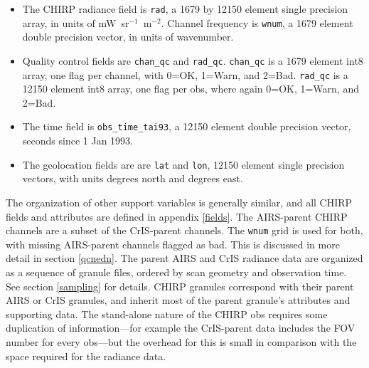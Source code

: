 \documentclass[11pt]{article}
\newcommand {\radunits} {\hbox{mW sr$^{-1}$ m$^{-2}$}}
\begin{document}
\begin{itemize}

\item
The CHIRP radiance field is \texttt{rad}, a 1679 by 12150 element
single precision array, in units of \radunits.  Channel frequency is
\texttt{wnum}, a 1679 element double precision vector, in units of
wavenumber.

\item
Quality control fields are \texttt{chan\_qc} and \texttt{rad\_qc}.
\texttt{chan\_qc} is a 1679 element int8 array, one flag per
channel, with 0=OK, 1=Warn, and 2=Bad.  \texttt{rad\_qc} is a 12150
element int8 array, one flag per obs, where again 0=OK, 1=Warn, and
2=Bad.

\item
The time field is \texttt{obs\_time\_tai93}, a 12150 element double
precision vector, seconds since 1 Jan 1993.

\item
The geolocation fields are are \texttt{lat} and \texttt{lon}, 12150
element single precision vectors, with units degrees north and
degrees east.

\end{itemize}

The organization of other support variables is generally similar, and
all CHIRP fields and attributes are defined in appendix \ref{fields}.
The AIRS-parent CHIRP channels are a subset of the CrIS-parent
channels.  The \texttt{wnum} grid is used for both, with missing
AIRS-parent channels flagged as bad.  This is discussed in more
detail in section \ref{qcnedn}.  The parent AIRS and CrIS radiance
data are organized as a sequence of granule files, ordered by scan
geometry and observation time.  See section \ref{sampling} for
details.  CHIRP granules correspond with their parent AIRS or CrIS
granules, and inherit most of the parent granule's attributes and
supporting data.  The stand-alone nature of the CHIRP obs requires
some duplication of information---for example the CrIS-parent data
includes the FOV number for every obs---but the overhead for this is
small in comparison with the space required for the radiance data.
\end{document}
